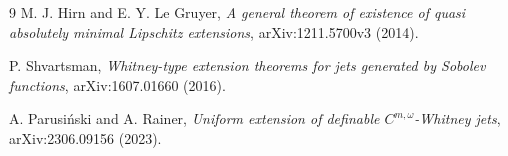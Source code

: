 \documentclass[11pt]{article}
\begin{document}
\begin{thebibliography}{9}
M. J. Hirn and E. Y. Le Gruyer,
\emph{A general theorem of existence of quasi absolutely minimal Lipschitz
extensions}, arXiv:1211.5700v3 (2014).

P. Shvartsman,
\emph{Whitney-type extension theorems for jets generated by Sobolev
functions}, arXiv:1607.01660 (2016).

A. Parusi\'nski and A. Rainer,
\emph{Uniform extension of definable $C^{m,\omega}$-Whitney jets},
arXiv:2306.09156 (2023).
\end{thebibliography}
\end{document}
